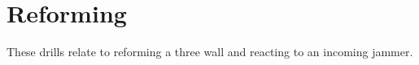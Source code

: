 \section*{Reforming}

These drills relate to reforming a three wall and reacting to an incoming jammer. 
